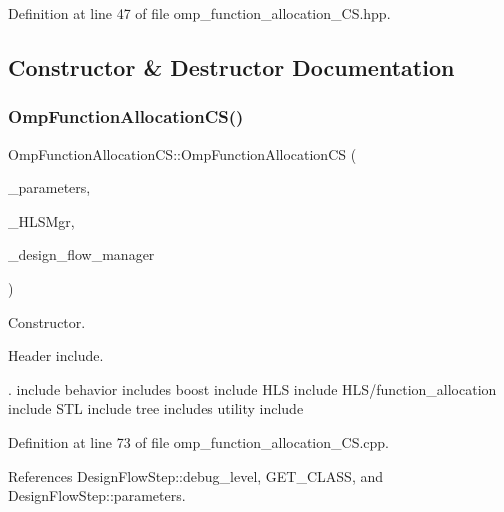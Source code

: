Definition at line 47 of file omp\+\_\+function\+\_\+allocation\+\_\+\+C\+S.\+hpp.



\subsection{Constructor \& Destructor Documentation}
\mbox{\label{classOmpFunctionAllocationCS_aad5b0328f317d0506cd2d098f1c5727c}} 
\subsubsection{\texorpdfstring{Omp\+Function\+Allocation\+C\+S()}{OmpFunctionAllocationCS()}}
{\footnotesize\ttfamily Omp\+Function\+Allocation\+C\+S\+::\+Omp\+Function\+Allocation\+CS (\begin{DoxyParamCaption}\item[{const \hyperlink{Parameter_8hpp_a37841774a6fcb479b597fdf8955eb4ea}{Parameter\+Const\+Ref}}]{\+\_\+parameters,  }\item[{const \hyperlink{hls__manager_8hpp_acd3842b8589fe52c08fc0b2fcc813bfe}{H\+L\+S\+\_\+manager\+Ref}}]{\+\_\+\+H\+L\+S\+Mgr,  }\item[{const Design\+Flow\+Manager\+Const\+Ref}]{\+\_\+design\+\_\+flow\+\_\+manager }\end{DoxyParamCaption})}



Constructor. 

Header include.

. include behavior includes boost include H\+LS include H\+L\+S/function\+\_\+allocation include S\+TL include tree includes utility include 

Definition at line 73 of file omp\+\_\+function\+\_\+allocation\+\_\+\+C\+S.\+cpp.



References Design\+Flow\+Step\+::debug\+\_\+level, G\+E\+T\+\_\+\+C\+L\+A\+SS, and Design\+Flow\+Step\+::parameters.

\mbox{\label{classOmpFunctionAllocationCS_a0204f54d5cac78855968461a6e0f5330}} 
